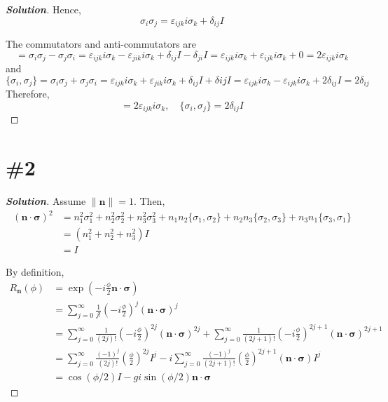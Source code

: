 \documentclass[a4paper,11pt]{article}
\newenvironment{solution}[1]
  {\renewcommand\qedsymbol{$\square$}\begin{proof}[\textbf{Solution#1}]}
  {\end{proof}}
\begin{document}
\begin{solution}{}
    Hence,
    \begin{equation}
        \sigma_i\sigma_j=\varepsilon_{ijk} i\sigma_k + \delta_{ij}I
    \end{equation}
    
    The commutators and anti-commutators are
    \begin{equation}
        [\sigma_i, \sigma_j]=\sigma_i\sigma_j-\sigma_j\sigma_i=\varepsilon_{ijk} i\sigma_k - \varepsilon_{jik} i\sigma_k + \delta_{ij}I - \delta_{ji}I=\varepsilon_{ijk} i\sigma_k + \varepsilon_{ijk} i\sigma_k + 0 = 2\varepsilon_{ijk} i\sigma_k
    \end{equation}
    and
    \begin{equation}
        \{\sigma_i, \sigma_j\}=\sigma_i\sigma_j+\sigma_j\sigma_i=\varepsilon_{ijk} i\sigma_k + \varepsilon_{jik} i\sigma_k + \delta_{ij}I + \delta{ij}I = \varepsilon_{ijk} i\sigma_k - \varepsilon_{ijk} i\sigma_k + 2\delta_{ij}I= 2 \delta_{ij}
    \end{equation}
    Therefore,
    \begin{equation}
        [\sigma_i, \sigma_j] = 2\varepsilon_{ijk} i\sigma_k,\quad \{\sigma_i, \sigma_j\}=2\delta_{ij}I
    \end{equation}
\end{solution}

\section{\#2}

\begin{solution}{}
    Assume $\|\mathbf n\| = 1$. Then,
    \begin{align}
        \left(\mathbf n\cdot\mathbf\sigma\right)^2&=n_1^2\sigma_1^2 + n_2^2\sigma_2^2 + n_3^2\sigma_3^2 + n_1n_2\{\sigma_1,\sigma_2\} + n_2n_3\{\sigma_2,\sigma_3\} + n_3n_1\{\sigma_3,\sigma_1\}\\
        &=(n_1^2+n_2^2+n_3^2) I\\
        &=I
    \end{align}

    By definition,
    \begin{align}
        R_{\mathbf n}(\phi)&=\exp\left(-i\frac{\phi}{2}\mathbf n\cdot\mathbf\sigma\right)\\
        &=\sum_{j=0}^{\infty} \frac{1}{j!}\left(-i\frac{\phi}{2}\right)^j\left(\mathbf n\cdot\mathbf\sigma\right)^j \\
        &=\sum_{j=0}^{\infty} \frac{1}{(2j)!}\left(-i\frac{\phi}{2}\right)^{2j}\left(\mathbf n\cdot\mathbf\sigma\right)^{2j} + \sum_{j=0}^{\infty} \frac{1}{(2j + 1)!}\left(-i\frac{\phi}{2}\right)^{2j+1}\left(\mathbf n\cdot\mathbf\sigma\right)^{2j+1} \\
        &=\sum_{j=0}^{\infty} \frac{(-1)^j}{(2j)!}\left(\frac{\phi}{2}\right)^{2j}I^{j} - i\sum_{j=0}^{\infty} \frac{(-1)^j}{(2j + 1)!}\left(\frac{\phi}{2}\right)^{2j+1}\left(\mathbf n\cdot\mathbf\sigma\right) I^j\\
        &=\cos(\phi/2)I -g i\sin(\phi/2)\mathbf n\cdot\mathbf\sigma
    \end{align}
    
    
\end{solution}
\end{document}
